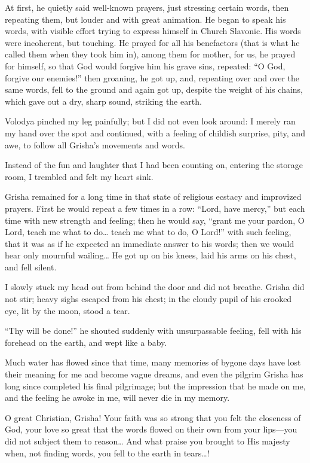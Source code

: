 At first, he quietly said well-known prayers, just stressing certain words, then repeating them, but louder and with great animation. He began to speak his words, with visible effort trying to express himself in Church Slavonic. His words were incoherent, but touching. He prayed for all his benefactors (that is what he called them when they took him in), among them for mother, for us, he prayed for himself, so that God would forgive him his grave sins, repeated: ``O God, forgive our enemies!'' then groaning, he got up, and, repeating over and over the same words, fell to the ground and again got up, despite the weight of his chains, which gave out a dry, sharp sound, striking the earth.

Volodya pinched my leg painfully; but I did not even look around: I merely ran my hand over the spot and continued, with a feeling of childish surprise, pity, and awe, to follow all Grisha's movements and words.

Instead of the fun and laughter that I had been counting on, entering the storage room, I trembled and felt my heart sink.

Grisha remained for a long time in that state of religious ecstacy and improvized prayers. First he would repeat a few times in a row: ``Lord, have mercy,'' but each time with new strength and feeling; then he would say, ``grant me your pardon, O Lord, teach me what to do\ldots{} teach me what to do, O Lord!'' with such feeling, that it was as if he expected an immediate answer to his words; then we would hear only mournful wailing\ldots{} He got up on his knees, laid his arms on his chest, and fell silent. %

I slowly stuck my head out from behind the door and did not breathe. Grisha did not stir; heavy sighs escaped from his chest; in the cloudy pupil of his crooked eye, lit by the moon, stood a tear. 

``Thy will be done!'' he shouted suddenly with unsurpassable feeling, fell with his forehead on the earth, and wept like a baby. %

Much water has flowed since that time, many memories of bygone days have lost their meaning for me and become vague dreams, and even the pilgrim Grisha has long since completed his final pilgrimage; but the impression that he made on me, and the feeling he awoke in me, will never die in my memory.

O great Christian, Grisha! Your faith was so strong that you felt the closeness of God, your love so great that the words flowed on their own from your lips---you did not subject them to reason\ldots{} And what praise you brought to His majesty when, not finding words, you fell to the earth in tears\ldots{}!

